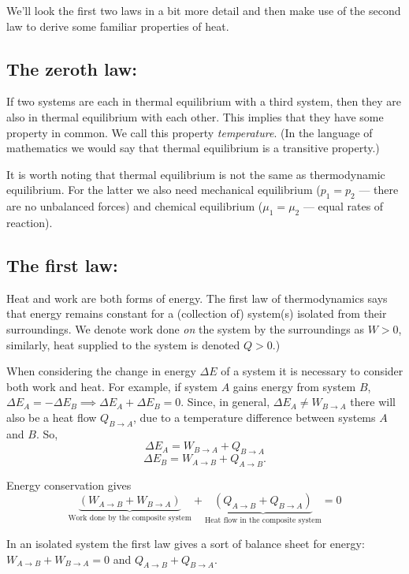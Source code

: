 We'll look the first two laws in a bit more detail and then make use of the second law to derive some familiar properties of heat.

\subsection{The zeroth law:}
If two systems are each in thermal equilibrium with a third system, then they are also in thermal equilibrium with each other. This implies that they have some property in common. We call this property \emph{temperature}. (In the language of mathematics we would say that thermal equilibrium is a transitive property.)

It is worth noting that thermal equilibrium is not the same as thermodynamic equilibrium. For the latter we also need mechanical equilibrium ($p_1=p_2$ --- there are no unbalanced forces) and chemical equilibrium ($\mu_1=\mu_2$ --- equal rates of reaction).

\subsection{The first law:}
Heat and work are both forms of energy. The first law of thermodynamics says that energy remains constant for a (collection of) system(s) isolated from their surroundings. We denote work done \emph{on} the system by the surroundings as $W>0$, similarly, heat supplied to the system is denoted $Q>0$.)

When considering the change in energy $\Delta E$ of a system it is necessary to consider both work and heat. For example, if system $A$ gains energy from system $B$, $\Delta E_A = -\Delta E_B \implies \Delta E_A + \Delta E_B =0$. Since, in general, $\Delta E_A\neq W_{B\rightarrow A}$ there will also be a heat flow $Q_{B\rightarrow A}$, due to a temperature difference between systems $A$ and $B$.
So,
$$\Delta E_A = W_{B\rightarrow A} + Q_{B\rightarrow A}$$
$$\Delta E_B = W_{A\rightarrow B} + Q_{A\rightarrow B}.$$

Energy conservation gives 
$$\underbrace{(W_{A\rightarrow B}+W_{B\rightarrow A})}_{\text{Work done by the composite system}} + \underbrace{(Q_{A\rightarrow B}+Q_{B\rightarrow A})}_{\text{Heat flow in the composite system}} = 0$$

In an isolated system the first law gives a sort of balance sheet for energy:
$W_{A\rightarrow B}+W_{B\rightarrow A} = 0$ and $Q_{A\rightarrow B}+Q_{B\rightarrow A}$.


